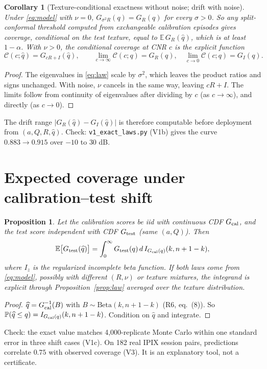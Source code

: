 \documentclass[11pt]{article}
\newtheorem{proposition}{Proposition}
\newtheorem{corollary}{Corollary}
\theoremstyle{remark}\newtheorem{remark}{Remark}
\newcommand{\E}{\mathbb E}\newcommand{\PP}{\mathbb P}\newcommand{\C}{\mathbb C}
\begin{document}
\begin{corollary}[Texture-conditional exactness without noise; drift with noise]\label{cor:texture}
Under \eqref{eq:model} with $\nu=0$, $G_{\sigma^2R}(q)=G_R(q)$ for every $\sigma>0$. So any split-conformal threshold computed from exchangeable calibration episodes gives coverage, conditional on the test texture, equal to $\E\,G_R(\widehat q)$, which is at least $1-\alpha$. With $\nu>0$, the conditional coverage at CNR $c$ is the explicit function
\[
\mathcal C(c;\widehat q)=G_{cR+I}(\widehat q),\qquad
\lim_{c\to\infty}\mathcal C(c;q)=G_R(q),\quad \lim_{c\to0}\mathcal C(c;q)=G_I(q).
\]
\end{corollary}
\begin{proof}
The eigenvalues in \eqref{eq:law} scale by $\sigma^2$, which leaves the product ratios and signs unchanged. With noise, $\nu$ cancels in the same way, leaving $cR+I$. The limits follow from continuity of eigenvalues after dividing by $c$ (as $c\to\infty$), and directly (as $c\to0$).
\end{proof}
\noindent The drift range $|G_R(\widehat q)-G_I(\widehat q)|$ is therefore computable before deployment from $(a,Q,R,\widehat q)$. Check: \texttt{v1\_exact\_laws.py} (V1b) gives the curve $0.883\to0.915$ over $-10$ to $30$ dB.

\section{Expected coverage under calibration--test shift}
\begin{proposition}\label{prop:shift}
Let the calibration scores be iid with continuous CDF $G_{\rm cal}$, and the test score independent with CDF $G_{\rm test}$ (same $(a,Q)$). Then
\[
\E\big[G_{\rm test}(\widehat q)\big]=\int_0^\infty G_{\rm test}(q)\,d\,I_{G_{\rm cal}(q)}(k,n+1-k),
\]
where $I_z$ is the regularized incomplete beta function. If both laws come from \eqref{eq:model}, possibly with different $(R,\nu)$ or texture mixtures, the integrand is explicit through Proposition~\ref{prop:law} averaged over the texture distribution.
\end{proposition}
\begin{proof}
$\widehat q=G_{\rm cal}^{-1}(B)$ with $B\sim\mathrm{Beta}(k,n+1-k)$ (R6, eq.~(8)). So $\PP(\widehat q\le q)=I_{G_{\rm cal}(q)}(k,n+1-k)$. Condition on $\widehat q$ and integrate.
\end{proof}
\noindent Check: the exact value matches 4,000-replicate Monte Carlo within one standard error in three shift cases (V1c). On 182 real IPIX session pairs, predictions correlate $0.75$ with observed coverage (V3). It is an explanatory tool, not a certificate.
\end{document}
